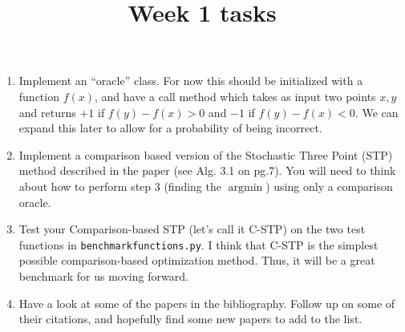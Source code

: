 \documentclass[12pt]{article}
\title{Week 1 tasks}
\DeclareMathOperator{\argmin}{\mathrm{argmin}}
\begin{document}
\maketitle

\begin{enumerate}
	\item Implement an ``oracle'' class. For now this should be initialized with a function $f(x)$, and have a call method which takes as input two points $x,y$ and returns $+1$ if $f(y) - f(x) > 0$ and $-1$ if $f(y) - f(x) < 0$. We can expand this later to allow for a probability of being incorrect.
	
	\item Implement a comparison based version of the Stochastic Three Point (STP) method described in the paper \cite{bergou2020stochastic} (see Alg. 3.1 on pg.7). You will need to think about how to perform step 3 (finding the $\argmin$) using only a comparison oracle. 
	
	\item Test your Comparison-based STP (let's call it C-STP) on the two test functions in  {\tt benchmarkfunctions.py}. I think that C-STP is the simplest possible comparison-based optimization method. Thus, it will be a great benchmark for us moving forward.
	
	\item Have a look at some of the papers in the bibliography. Follow up on some of their citations, and hopefully find some new papers to add to the list.

\end{enumerate}



\end{document}
